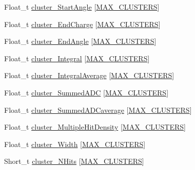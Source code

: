 \begin{DoxyCompactItemize}
Float\-\_\-t \hyperlink{classanatree_a635037cd901f82f5989db10754a3daaa}{cluster\-\_\-\-Start\-Angle} \mbox{[}\hyperlink{anatree__core__v09410002_8h_a7250daa0fff832693cecd6907e64f6ec}{M\-A\-X\-\_\-\-C\-L\-U\-S\-T\-E\-R\-S}\mbox{]}
\item 
Float\-\_\-t \hyperlink{classanatree_a8ff61ed4971f8971c8dcd7864f8365a6}{cluster\-\_\-\-End\-Charge} \mbox{[}\hyperlink{anatree__core__v09410002_8h_a7250daa0fff832693cecd6907e64f6ec}{M\-A\-X\-\_\-\-C\-L\-U\-S\-T\-E\-R\-S}\mbox{]}
\item 
Float\-\_\-t \hyperlink{classanatree_a78a610702659e215d108a77093d55962}{cluster\-\_\-\-End\-Angle} \mbox{[}\hyperlink{anatree__core__v09410002_8h_a7250daa0fff832693cecd6907e64f6ec}{M\-A\-X\-\_\-\-C\-L\-U\-S\-T\-E\-R\-S}\mbox{]}
\item 
Float\-\_\-t \hyperlink{classanatree_ac129a3af06f26d24412a2d586870876b}{cluster\-\_\-\-Integral} \mbox{[}\hyperlink{anatree__core__v09410002_8h_a7250daa0fff832693cecd6907e64f6ec}{M\-A\-X\-\_\-\-C\-L\-U\-S\-T\-E\-R\-S}\mbox{]}
\item 
Float\-\_\-t \hyperlink{classanatree_a378a2760d90681d32eae8e58ee2fbc4d}{cluster\-\_\-\-Integral\-Average} \mbox{[}\hyperlink{anatree__core__v09410002_8h_a7250daa0fff832693cecd6907e64f6ec}{M\-A\-X\-\_\-\-C\-L\-U\-S\-T\-E\-R\-S}\mbox{]}
\item 
Float\-\_\-t \hyperlink{classanatree_a397a20760df6b185d51e4ec05a2c3cc2}{cluster\-\_\-\-Summed\-A\-D\-C} \mbox{[}\hyperlink{anatree__core__v09410002_8h_a7250daa0fff832693cecd6907e64f6ec}{M\-A\-X\-\_\-\-C\-L\-U\-S\-T\-E\-R\-S}\mbox{]}
\item 
Float\-\_\-t \hyperlink{classanatree_ae92ddb9730100551d6f56993330895d9}{cluster\-\_\-\-Summed\-A\-D\-Caverage} \mbox{[}\hyperlink{anatree__core__v09410002_8h_a7250daa0fff832693cecd6907e64f6ec}{M\-A\-X\-\_\-\-C\-L\-U\-S\-T\-E\-R\-S}\mbox{]}
\item 
Float\-\_\-t \hyperlink{classanatree_a0ba0ad2840d19d34be27051d33438d1d}{cluster\-\_\-\-Multiple\-Hit\-Density} \mbox{[}\hyperlink{anatree__core__v09410002_8h_a7250daa0fff832693cecd6907e64f6ec}{M\-A\-X\-\_\-\-C\-L\-U\-S\-T\-E\-R\-S}\mbox{]}
\item 
Float\-\_\-t \hyperlink{classanatree_a9240388979e46e4338b8f4a819ea34ff}{cluster\-\_\-\-Width} \mbox{[}\hyperlink{anatree__core__v09410002_8h_a7250daa0fff832693cecd6907e64f6ec}{M\-A\-X\-\_\-\-C\-L\-U\-S\-T\-E\-R\-S}\mbox{]}
\item 
Short\-\_\-t \hyperlink{classanatree_ae64b28cc588826048d6665ca84e0b7da}{cluster\-\_\-\-N\-Hits} \mbox{[}\hyperlink{anatree__core__v09410002_8h_a7250daa0fff832693cecd6907e64f6ec}{M\-A\-X\-\_\-\-C\-L\-U\-S\-T\-E\-R\-S}\mbox{]}

\end{DoxyCompactItemize}
